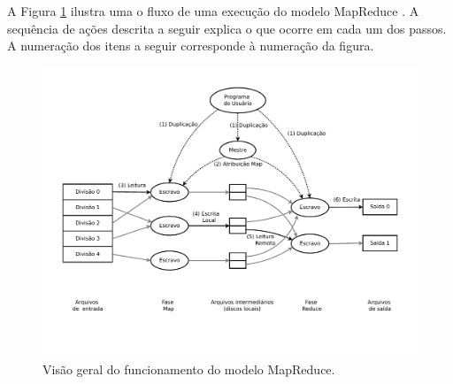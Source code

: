A Figura \ref{fig:MapReduceoverview} ilustra uma o fluxo de uma execução do modelo MapReduce \cite{Dean:2008}. A sequência de ações descrita a seguir explica o que ocorre em cada um dos passos. A numeração dos itens a seguir corresponde à numeração da figura.

 \begin{figure}[!htb]
 \centering
\includegraphics[trim=0cm 2cm 0cm 1cm, width=\textwidth]{figuras/MapReduceOverflow.pdf}
\caption{Visão geral do funcionamento do modelo MapReduce.}
\label{fig:MapReduceoverview}
\end{figure}

